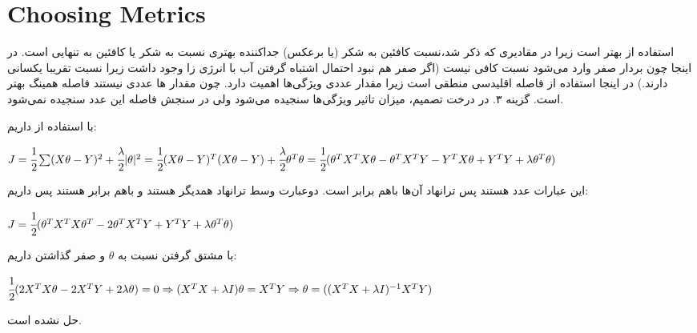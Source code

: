\documentclass[a4paper,14pt]{extarticle}
\begin{document}
\section{Choosing Metrics}
استفاده از 
بهتر است زیرا در مقادیری که ذکر شد،‌نسبت کافئین به شکر (یا برعکس) جداکننده بهتری نسبت به شکر یا کافئین به تنهایی است.
در اینجا چون بردار صفر وارد می‌شود نسبت کافی نیست (اگر صفر هم نبود احتمال اشتباه گرفتن آب با انرژی زا وجود داشت زیرا نسبت تقریبا یکسانی دارند.) در اینجا استفاده از فاصله اقلیدسی منطقی است زیرا مقدار عددی ویژگی‌ها اهمیت دارد.
چون مقدار ها عددی نیستند فاصله همینگ بهتر است.
گزینه ۳. در درخت تصمیم، میزان تاثیر ویژگی‌ها سنجیده می‌شود ولی در سنجش فاصله این عدد سنجیده نمی‌شود. 

با استفاده از 
داریم:
\begin{latin}
	$
	J = \cfrac{1}{2}  \sum (X \theta - Y )^2 + \cfrac{\lambda}{2} |\theta|^2
	= \cfrac{1}{2} (X \theta - Y )^T(X \theta - Y ) + \cfrac{\lambda}{2} \theta^T \theta
	\\\\
	= \cfrac{1}{2} (\theta ^ T X^T X \theta - \theta ^ T X^T Y - Y^T X \theta + Y^T Y + \lambda \theta^T \theta )
	$
\end{latin}
این عبارات عدد هستند پس ترانهاد آن‌ها باهم برابر است. دوعبارت وسط ترانهاد همدیگر هستند و باهم برابر هستند پس داریم:
\begin{latin}
	$
	J = \cfrac{1}{2} (\theta ^ T X^T X \theta^T - 2 \theta^T X^T Y + Y^T Y + \lambda \theta^T \theta)
	$
\end{latin}
با مشتق گرفتن نسبت به $\theta$ و صفر گذاشتن داریم:
\begin{latin}
	$
  \cfrac{1}{2}  (2X^T X \theta - 2 X ^ T Y  + 2 \lambda \theta) = 0 
  \Rightarrow
  (X^T X + \lambda I ) \theta =  X ^ T Y  
  \\
  \Rightarrow
  \theta = ((X^T X + \lambda I ) ^{-1}  X^T Y)
	$
\end{latin}
حل نشده است.
\end{document}

